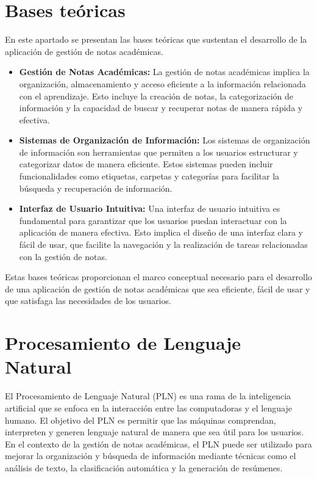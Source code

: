 \section{Bases teóricas}
\noindent En este apartado se presentan las bases teóricas que sustentan el desarrollo de la aplicación de gestión de notas académicas.
\begin{itemize}
    \item \textbf{Gestión de Notas Académicas:} La gestión de notas académicas implica la organización, almacenamiento y acceso eficiente a la información relacionada con el aprendizaje. Esto incluye la creación de notas, la categorización de información y la capacidad de buscar y recuperar notas de manera rápida y efectiva.\cite{williams_reference_2024}  
    \item \textbf{Sistemas de Organización de Información:} Los sistemas de organización de información son herramientas que permiten a los usuarios estructurar y categorizar datos de manera eficiente. Estos sistemas pueden incluir funcionalidades como etiquetas, carpetas y categorías para facilitar la búsqueda y recuperación de información.\cite{collado_concepto_nodate}  
    \item \textbf{Interfaz de Usuario Intuitiva:} Una interfaz de usuario intuitiva es fundamental para garantizar que los usuarios puedan interactuar con la aplicación de manera efectiva. Esto implica el diseño de una interfaz clara y fácil de usar, que facilite la navegación y la realización de tareas relacionadas con la gestión de notas.\cite{ingenieria_de_usabilidad}  
\end{itemize}
Estas bases teóricas proporcionan el marco conceptual necesario para el desarrollo de una aplicación de gestión de notas académicas que sea eficiente, fácil de usar y que satisfaga las necesidades de los usuarios.
\vspace{1cm}


\section{Procesamiento de Lenguaje Natural}
El Procesamiento de Lenguaje Natural (PLN) es una rama de la inteligencia artificial que se enfoca en la interacción entre las computadoras y el lenguaje humano. El objetivo del PLN es permitir que las máquinas comprendan, interpreten y generen lenguaje natural de manera que sea útil para los usuarios. En el contexto de la gestión de notas académicas, el PLN puede ser utilizado para mejorar la organización y búsqueda de información mediante técnicas como el análisis de texto, la clasificación automática y la generación de resúmenes.\cite{procesamiento_lenguaje_natural}

